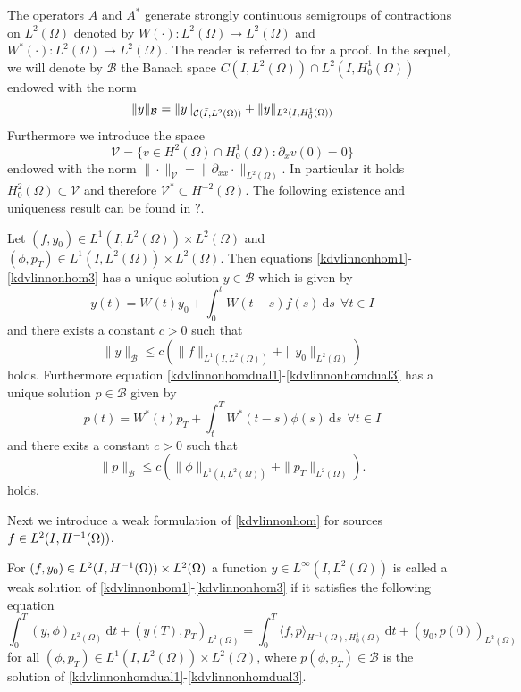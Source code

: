The operators $A$ and $A^*$ generate strongly continuous semigroups of contractions on $L^{2}(\Omega)$ denoted by $W(\cdot)\colon L^2(\Omega)\rightarrow L^2(\Omega)$ and $W^*(\cdot)\colon L^2(\Omega)\rightarrow L^2(\Omega)$. The reader is referred to \cite[Proposition 3.1]{rosier1997exact} for a proof.  In the sequel, we will denote by $\mathcal{B}$ the Banach space
$C(I,L^2(\Omega))\cap L^2(I,H^1_0(\Omega))$ endowed with the norm
\[
\lVert y\rVert_{\mathcal{B}} = \lVert y\rVert_{\mathcal C(\bar I,L^2(\Omega))}+ \lVert y\rVert_{L^2(I,H^1_0(\Omega))}
\]
Furthermore we introduce the space
\[
\mathcal V =\{v\in H^2(\Omega)\cap H^1_0(\Omega)\colon \partial_xv(0)=0\}
\]
endowed with the norm $\|\cdot\|_{\mathcal V}=\|\partial_{xx}\cdot\|_{L^2(\Omega)}$. In particular it holds $H^2_0(\Omega)\subset\mathcal V$ and therefore $\mathcal V^*\subset H^{-2}(\Omega)$. The following existence and uniqueness result can be found in ?.
\begin{prop}
Let $(f,y_0)\in L^1(I,L^2(\Omega))\times L^2(\Omega)$ and $(\phi,p_T)\in L^1(I,L^2(\Omega))\times L^2(\Omega)$. Then equations \eqref{kdvlinnonhom1}-\eqref{kdvlinnonhom3} has a unique solution $y\in \mathcal B$ which is given by
\[
y(t)=W(t)y_0+\int_0^tW(t-s)f(s)~\mathrm ds~~\forall t\in I
\]
and there exists a constant $c>0$ such that
\[
\|y\|_{\mathcal B}\leq c(\|f\|_{L^1(I,L^2(\Omega))}+\|y_0\|_{L^2(\Omega)})
\]
holds. Furthermore equation \eqref{kdvlinnonhomdual1}-\eqref{kdvlinnonhomdual3} has a unique solution $p\in \mathcal B$
given by 
\[
p(t)=W^*(t)p_T+\int_t^TW^*(t-s)\phi(s)~\mathrm ds~~\forall t\in I
\]
and there exits a constant $c>0$ such that
\[
\|p\|_{\mathcal B}\leq c(\|\phi\|_{L^1(I,L^2(\Omega))}+\|p_T\|_{L^2(\Omega)}).
\]
holds.
\end{prop}
Next we introduce a weak formulation of \eqref{kdvlinnonhom} for sources $f\in \Hm1$.
\begin{Def}
For $(f,y_0)\in \Hm1\times L^2(\Omega)$ a function $y\in L^\infty(I,L^2(\Omega))$ is called a weak solution of \eqref{kdvlinnonhom1}-\eqref{kdvlinnonhom3} if it satisfies the following equation
\begin{equation}\label{weakformlinearkdv}
\int_0^T(y,\phi)_{L^2(\Omega)}~\mathrm dt+(y(T),p_T)_{L^2(\Omega)}=\int_0^T\langle f,p\rangle_{H^{-1}(\Omega),H^1_0(\Omega)}~\mathrm dt+(y_0,p(0))_{L^2(\Omega)}
\end{equation}
for all $(\phi,p_T) \in L^1(I,L^2(\Omega))\times L^2(\Omega)$, where $p(\phi,p_T)\in \mathcal B$ is the solution of \eqref{kdvlinnonhomdual1}-\eqref{kdvlinnonhomdual3}.
\end{Def}
